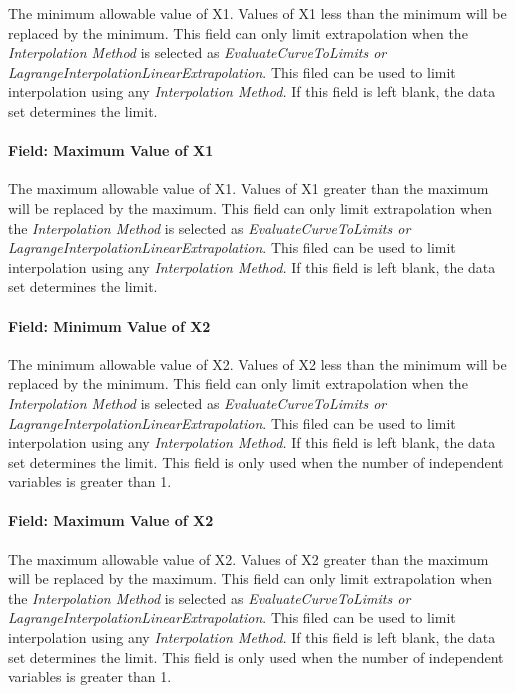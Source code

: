 The minimum allowable value of X1. Values of X1 less than the minimum will be replaced by the minimum. This field can only limit extrapolation when the \emph{Interpolation Method} is selected as \emph{EvaluateCurveToLimits or LagrangeInterpolationLinearExtrapolation}. This filed can be used to limit interpolation using any \emph{Interpolation Method.} If this field is left blank, the data set determines the limit.

\paragraph{Field: Maximum Value of X1}\label{field-maximum-value-of-x1}

The maximum allowable value of X1. Values of X1 greater than the maximum will be replaced by the maximum. This field can only limit extrapolation when the \emph{Interpolation Method} is selected as \emph{EvaluateCurveToLimits or LagrangeInterpolationLinearExtrapolation}. This filed can be used to limit interpolation using any \emph{Interpolation Method.} If this field is left blank, the data set determines the limit.

\paragraph{Field: Minimum Value of X2}\label{field-minimum-value-of-x2}

The minimum allowable value of X2. Values of X2 less than the minimum will be replaced by the minimum. This field can only limit extrapolation when the \emph{Interpolation Method} is selected as \emph{EvaluateCurveToLimits or LagrangeInterpolationLinearExtrapolation}. This filed can be used to limit interpolation using any \emph{Interpolation Method.} If this field is left blank, the data set determines the limit. This field is only used when the number of independent variables is greater than 1.

\paragraph{Field: Maximum Value of X2}\label{field-maximum-value-of-x2}

The maximum allowable value of X2. Values of X2 greater than the maximum will be replaced by the maximum. This field can only limit extrapolation when the \emph{Interpolation Method} is selected as \emph{EvaluateCurveToLimits or LagrangeInterpolationLinearExtrapolation}. This filed can be used to limit interpolation using any \emph{Interpolation Method.} If this field is left blank, the data set determines the limit. This field is only used when the number of independent variables is greater than 1.

